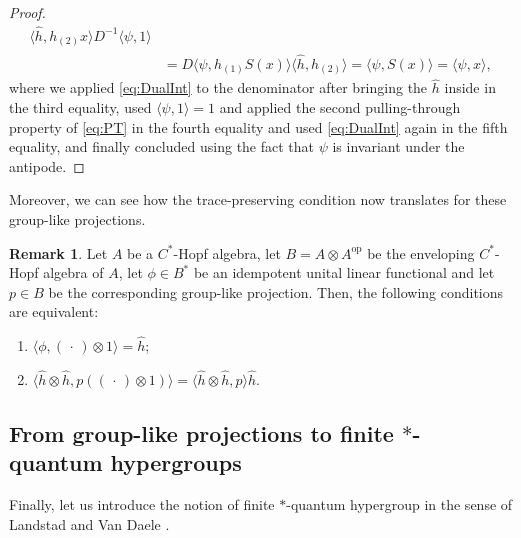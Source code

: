 \documentclass[a4paper,10pt]{amsart}
\newcommand{\eval}[2]{\langle #1 , #2\rangle}
\newcommand{\placeholder}{\,\cdot\,}
\theoremstyle{definition}
\newtheorem{remark}[theorem]{Remark}
\begin{document}
\begin{proof}
\begin{align*}
{            \eval{\hat{h}}{h_{(2)} x}}{D^{-1} \eval{\psi}{1}}
        \\
        &=
        D \eval{\psi}{h_{(1)} S(x)}
            \eval{\hat{h}}{h_{(2)}}
        =
        \eval{\psi}{S(x)}
        =
            \eval{\psi}{x},
    \end{align*}
	where we applied \cref{eq:DualInt} to the denominator after bringing the $\hat{h}$ inside in the third equality, used $\eval{\psi}{1}=1$ and applied the second pulling-through property of \cref{eq:PT} in the fourth equality and used \cref{eq:DualInt} again in the fifth equality, and finally concluded using the fact that $\psi$ is invariant under the antipode.
\end{proof}

Moreover, we can see how the trace-preserving condition now translates for these group-like projections.
\begin{remark}
\label{prop:TPgrouplike}
Let $A$ be a $C^*$-Hopf algebra, let $B=A\otimes A^{\mathrm{op}}$ be the enveloping $C^*$-Hopf algebra of $A$, let $\phi\in B^*$ be an idempotent unital linear functional and let $p \in B$ be the corresponding group-like projection. Then, the following conditions are equivalent:
\begin{enumerate}
    \item[(i)] $\eval{\phi}{(\placeholder)\otimes 1}= \hat{h}$;
    \item[(ii)] $\eval{\hat{h}\otimes \hat{h}}{p ((\placeholder) \otimes 1)}=\eval{\hat{h} \otimes \hat{h}}{p} \hat{h}$.
\end{enumerate}
\end{remark}

\subsection{From group-like projections to finite \texorpdfstring{$\boldsymbol{*}$}{*}-quantum hypergroups}

Finally, let us introduce the notion of finite $*$-quantum hypergroup in the sense of Landstad and Van Daele \cite[Definition~3.11]{landstad_finite_2025}.
\end{document}
